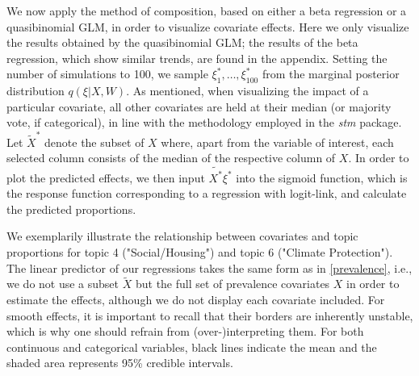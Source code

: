 \noindent We now apply the method of composition, based on either a beta regression or a quasibinomial GLM, in order to visualize covariate effects. Here we only visualize the results obtained by the quasibinomial GLM; the results of the beta regression, which show similar trends, are found in the appendix. Setting the number of simulations to 100, we sample $\xi^*_1, \dots, \xi^*_{100}$ from the  marginal posterior distribution $q(\xi | X, W)$. As mentioned, when visualizing the impact of a particular covariate, all other covariates are held at their median (or majority vote, if categorical), in line with the methodology employed in the \textit{stm} package.
Let $\tilde{X}^*$ denote the subset of $X$ where, apart from the variable of interest, each selected column consists of the median of the respective column of $X$. In order to plot the predicted effects, we then input $\tilde{X^*}\xi^*$ into the sigmoid function, which is the response function corresponding to a regression with logit-link, and calculate the predicted proportions. 

We exemplarily illustrate the relationship between covariates and topic proportions for topic 4 ("Social/Housing") and topic 6 ("Climate Protection"). The linear predictor of our regressions takes the same form as in  \eqref{prevalence}, i.e., we do not use a subset $\tilde{X}$ but the full set of prevalence covariates $X$ in order to estimate the effects, although we do not display each covariate included. For smooth effects, it is important to recall that their borders are inherently unstable, which is why one should refrain from (over-)interpreting them. For both continuous and categorical variables, black lines indicate the mean and the shaded area represents 95\% credible intervals.

